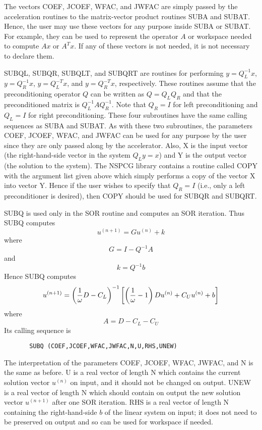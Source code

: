 \bigskip
\noindent
The vectors COEF, JCOEF, WFAC, and JWFAC are simply passed by 
the acceleration routines to the matrix-vector product routines SUBA
and SUBAT.  Hence, the user may use these vectors for any purpose
inside SUBA or SUBAT.  For example, they can be used to represent 
the operator $A$ or workspace needed to compute $Ax$ or $A^Tx$.  
If any of these vectors is not needed, it is not necessary to
declare them. 
 
   SUBQL, SUBQR, SUBQLT, and SUBQRT are routines for performing
\mbox{$y=Q_L^{-1}x$}, \mbox{$y=Q_R^{-1}x$},
\mbox{$y=Q_L^{-T}x$}, and \mbox{$y=Q_R^{-T}x$},
respectively.  These routines assume that the preconditioning
operator $Q$ can be written as $Q=Q_LQ_R$ and that the preconditioned
matrix is $Q_L^{-1}AQ_R^{-1}$.  Note that $Q_R=I$ for left
preconditioning and $Q_L=I$ for right preconditioning.  These
four subroutines have the same calling sequences as SUBA and
SUBAT.  As with these two subroutines, the parameters COEF,
JCOEF, WFAC, and JWFAC can be used for any purpose by the user
since they are only passed along by the accelerator.  Also,
X is the input vector (the right-hand-side vector in the
system $Q_Ly=x$) and Y is the output vector (the solution
to the system).  The NSPCG library contains a routine called
COPY with the argument list given above which simply performs
a copy of the vector X into vector Y.  Hence if the user wishes
to specify that $Q_R=I$ (i.e., only a left preconditioner is
desired), then COPY should be used for SUBQR and SUBQRT.
 
   SUBQ is used only in the SOR routine and computes an SOR iteration.
Thus SUBQ computes
\[ u^{(n+1)} = Gu^{(n)} + k \]
where
\[ G = I - Q^{-1}A \]
and
\[ k = Q^{-1}b \]
Hence SUBQ computes
\[ u^{(n+1)} = \left( \frac{1}{\omega} D-C_L \right)^{-1}\left[ \left( \frac{1}{\omega}-1 \right) Du^{(n)}
              + C_Uu^{(n)}+b \right] \]
where
\[ A = D-C_L-C_U \]
Its calling sequence is
\begin{verbatim}
       SUBQ (COEF,JCOEF,WFAC,JWFAC,N,U,RHS,UNEW)
\end{verbatim}
The interpretation of the parameters COEF, JCOEF, WFAC, JWFAC,
and N is the same as before.  U is a real vector of length N 
which contains the current solution vector $u^{(n)}$ on input, and 
it should not be changed on output.  UNEW is a real vector of length 
N which should contain on output the new solution vector $u^{(n+1)}$ 
after one SOR iteration.  RHS is a real vector of length N containing 
the right-hand-side $b$ of the linear system on input; it does not 
need to be preserved on output and so can be used for workspace 
if needed.
 
